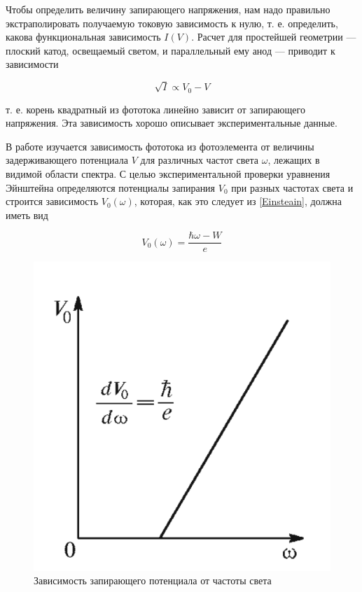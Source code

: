 \documentclass[a4paper, 12pt]{article}
\begin{document}
	Чтобы определить величину запирающего
	напряжения, нам надо правильно экстраполировать получаемую токовую зависимость к нулю, т. е. определить, какова функциональная
	зависимость $ I(V) $. Расчет для простейшей геометрии --- плоский катод, освещаемый светом, и параллельный ему анод --- приводит к зависимости
	
	\begin{equation}\label{sqrt I = V}
	\sqrt{I} \propto V_0 - V
	\end{equation}
	
	т. е. корень квадратный из фототока линейно
	зависит от запирающего напряжения. Эта зависимость хорошо описывает экспериментальные данные.
	
	В работе изучается зависимость фототока из фотоэлемента от величины задерживающего потенциала $ V $ для различных частот света $ \omega $, лежащих в видимой области спектра. С целью экспериментальной
	проверки уравнения Эйнштейна определяются потенциалы запирания
	$ V_0 $ при разных частотах света и строится зависимость $ V_0(\omega) $, которая, как это следует из \eqref{Einsteain}, должна иметь вид
	
	\begin{equation}\label{V(w)}
	V_0 (\omega) = \dfrac{\hbar\omega - W}{e}
	\end{equation}
	
		\begin{figure}
		\includegraphics[width=\linewidth]{V_w.png}
		\caption{Зависимость запирающего потенциала
			от частоты света}
		\label{ris V(w)}
	\end{figure}
	
\end{document}
